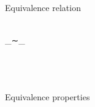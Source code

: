 Equivalence relation

\begin{code}\>\<%
\\
\>  \_∼\_\<%
\\
%
\\
\> \AgdaSymbol{:}     \<%
\\
\>\AgdaSymbol{(} \AgdaInductiveConstructor{,} \AgdaSymbol{)}  \AgdaSymbol{(} \AgdaInductiveConstructor{,} \AgdaSymbol{)} \AgdaSymbol{=} \AgdaSymbol{(} \AgdaPrimitive{+} \AgdaSymbol{)}  \AgdaSymbol{(} \AgdaPrimitive{+} \AgdaSymbol{)}\<%
\\
\>\<\end{code}

Equivalence properties

